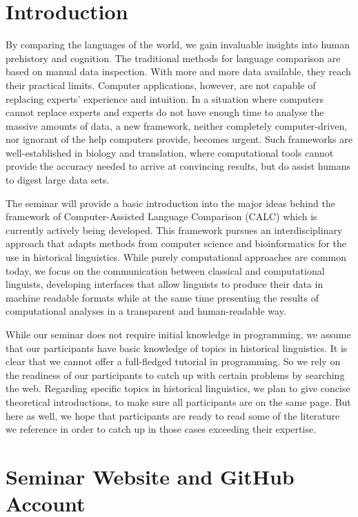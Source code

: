 
\section{Introduction}\label{introduction}

By comparing the languages of the world, we gain invaluable insights
into human prehistory and cognition. The traditional methods for
language comparison are based on manual data inspection. With more and
more data available, they reach their practical limits. Computer
applications, however, are not capable of replacing experts' experience
and intuition. In a situation where computers cannot replace experts and
experts do not have enough time to analyse the massive amounts of data,
a new framework, neither completely computer-driven, nor ignorant of the
help computers provide, becomes urgent. Such frameworks are
well-established in biology and translation, where computational tools
cannot provide the accuracy needed to arrive at convincing results, but
do assist humans to digest large data sets.

The seminar will provide a basic introduction into the major ideas
behind the framework of Computer-Assisted Language Comparison (CALC)
which is currently actively being developed. This framework pursues an
interdisciplinary approach that adapts methods from computer science and
bioinformatics for the use in historical linguistics. While purely
computational approaches are common today, we focus on the communication
between classical and computational linguists, developing interfaces
that allow linguists to produce their data in machine readable formats
while at the same time presenting the results of computational analyses
in a transparent and human-readable way.

While our seminar does not require initial knowledge in programming, we
assume that our participants have basic knowledge of topics in
historical linguistics. It is clear that we cannot offer a full-fledged
tutorial in programming. So we rely on the readiness of our participants
to catch up with certain problems by searching the web. Regarding
specific topics in historical linguistics, we plan to give concise
theoretical introductions, to make sure all participants are on the same
page. But here as well, we hope that participants are ready to read some
of the literature we reference in order to catch up in those cases
exceeding their expertise.

\section{Seminar Website and GitHub
Account}\label{seminar-website-and-github-account}

